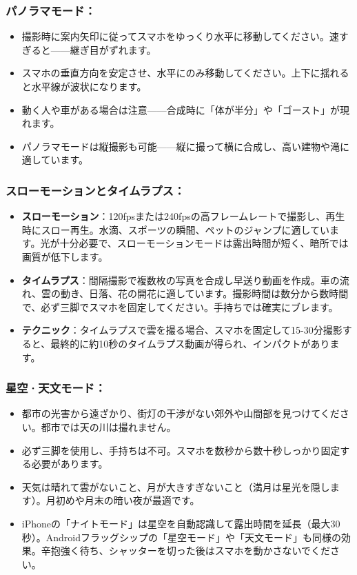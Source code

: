 \subsubsection*{パノラマモード：}

\begin{itemize}
  \item 撮影時に案内矢印に従ってスマホをゆっくり水平に移動してください。速すぎると——継ぎ目がずれます。
  \item スマホの垂直方向を安定させ、水平にのみ移動してください。上下に揺れると水平線が波状になります。
  \item 動く人や車がある場合は注意——合成時に「体が半分」や「ゴースト」が現れます。
  \item パノラマモードは縦撮影も可能——縦に撮って横に合成し、高い建物や滝に適しています。
\end{itemize}

\subsubsection*{スローモーションとタイムラプス：}

\begin{itemize}
  \item \textbf{スローモーション}：120fpsまたは240fpsの高フレームレートで撮影し、再生時にスロー再生。水滴、スポーツの瞬間、ペットのジャンプに適しています。光が十分必要で、スローモーションモードは露出時間が短く、暗所では画質が低下します。
  \item \textbf{タイムラプス}：間隔撮影で複数枚の写真を合成し早送り動画を作成。車の流れ、雲の動き、日落、花の開花に適しています。撮影時間は数分から数時間で、必ず三脚でスマホを固定してください。手持ちでは確実にブレます。
  \item \textbf{テクニック}：タイムラプスで雲を撮る場合、スマホを固定して15-30分撮影すると、最終的に約10秒のタイムラプス動画が得られ、インパクトがあります。
\end{itemize}

\subsubsection*{星空·天文モード：}

\begin{itemize}
  \item 都市の光害から遠ざかり、街灯の干渉がない郊外や山間部を見つけてください。都市では天の川は撮れません。
  \item 必ず三脚を使用し、手持ちは不可。スマホを数秒から数十秒しっかり固定する必要があります。
  \item 天気は晴れて雲がないこと、月が大きすぎないこと（満月は星光を隠します）。月初めや月末の暗い夜が最適です。
  \item iPhoneの「ナイトモード」は星空を自動認識して露出時間を延長（最大30秒）。Androidフラッグシップの「星空モード」や「天文モード」も同様の効果。辛抱強く待ち、シャッターを切った後はスマホを動かさないでください。
\end{itemize}

